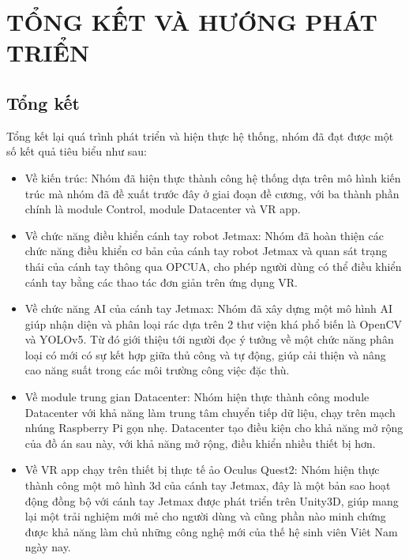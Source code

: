 \chapter{TỔNG KẾT VÀ HƯỚNG PHÁT TRIỂN}
\section{Tổng kết}
Tổng kết lại quá trình phát triển và hiện thực hệ thống, nhóm đã đạt được một số kết quả tiêu biểu như sau:
\begin{itemize}
    \item Về kiến trúc: Nhóm đã hiện thực thành công hệ thống dựa trên mô hình kiến trúc mà nhóm đã đề xuất trước đây ở giai đoạn đề cương, với ba thành phần chính là module Control, module Datacenter và VR app. 
    \item Về chức năng điều khiển cánh tay robot Jetmax: Nhóm đã hoàn thiện
    các chức năng điều khiển cơ bản của cánh tay robot Jetmax và quan sát trạng thái của cánh tay thông qua OPCUA, cho phép người dùng có thể điều khiển cánh tay bằng các thao tác đơn giản trên ứng dụng VR. 
    \item Về chức năng AI của cánh tay Jetmax: Nhóm đã xây dựng một mô hình AI giúp nhận diện và phân loại rác dựa trên 2 thư viện khá phổ biến là OpenCV và YOLOv5. Từ đó giới thiệu tới người đọc ý tưởng về một chức năng phân loại có mới có sự kết hợp giữa thủ công và tự động, giúp cải thiện và nâng cao năng suất trong các môi trường công việc đặc thù.
    \item Về module trung gian Datacenter: Nhóm hiện thực thành công module Datacenter với khả năng làm trung tâm chuyển tiếp dữ liệu, chạy trên mạch nhúng Raspberry Pi gọn nhẹ. Datacenter tạo điều kiện cho khả năng mở rộng của đồ án sau này, với khả năng mở rộng, điều khiển nhiều thiết bị hơn.
    \item Về VR app chạy trên thiết bị thực tế ảo Oculus Quest2: Nhóm hiện thực thành công một mô hình 3d của cánh tay Jetmax, đây là một bản sao hoạt động đồng bộ với cánh tay Jetmax được phát triển trên Unity3D, giúp mang lại một trải nghiệm mới mẻ cho người dùng và cũng phần nào minh chứng được khả năng làm chủ những công nghệ mới của thế hệ sinh viên Viêt Nam ngày nay.  
\end{itemize}

